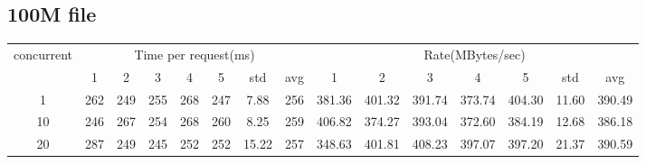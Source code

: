 \documentclass{article}
\begin{document}
\subsection*{100M file}
\begin{table}[H]
    \begin{tabular}{|c|c|c|c|c|c|c|c|c|c|c|c|c|c|c|}
        \hline
        \multirow{2}{*}{concurrent} & \multicolumn{7}{c|}{Time per request(ms)} & \multicolumn{7}{c|}{Rate(MBytes/sec)}                                                                                               \\ \cline{2-15}
                                    & 1                                         & 2                                     & 3   & 4   & 5   & std   & avg & 1      & 2      & 3      & 4      & 5      & std   & avg    \\ \hline
        1                           & 262                                       & 249                                   & 255 & 268 & 247 & 7.88  & 256 & 381.36 & 401.32 & 391.74 & 373.74 & 404.30 & 11.60 & 390.49 \\ \hline
        10                          & 246                                       & 267                                   & 254 & 268 & 260 & 8.25  & 259 & 406.82 & 374.27 & 393.04 & 372.60 & 384.19 & 12.68 & 386.18 \\ \hline
        20                          & 287                                       & 249                                   & 245 & 252 & 252 & 15.22 & 257 & 348.63 & 401.81 & 408.23 & 397.07 & 397.20 & 21.37 & 390.59 \\ \hline
    \end{tabular}
\end{table}
\end{document}

